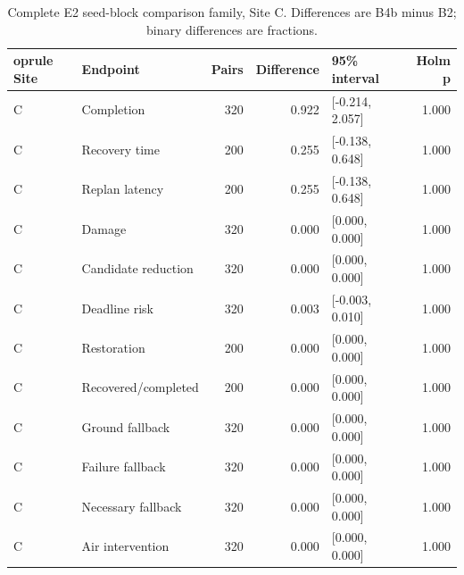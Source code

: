 \begin{table}[H]\centering\footnotesize
\caption{Complete E2 seed-block comparison family, Site C. Differences are B4b minus B2; binary differences are fractions.}\label{tab:e2_C}
\begin{tabularx}{\textwidth}{@{}lYrrYr@{}}	oprule
Site & Endpoint & Pairs & Difference & 95\% interval & Holm p \\\midrule
C & Completion & 320 & 0.922 & [-0.214, 2.057] & 1.000 \\
C & Recovery time & 200 & 0.255 & [-0.138, 0.648] & 1.000 \\
C & Replan latency & 200 & 0.255 & [-0.138, 0.648] & 1.000 \\
C & Damage & 320 & 0.000 & [0.000, 0.000] & 1.000 \\
C & Candidate reduction & 320 & 0.000 & [0.000, 0.000] & 1.000 \\
C & Deadline risk & 320 & 0.003 & [-0.003, 0.010] & 1.000 \\
C & Restoration & 200 & 0.000 & [0.000, 0.000] & 1.000 \\
C & Recovered/completed & 200 & 0.000 & [0.000, 0.000] & 1.000 \\
C & Ground fallback & 320 & 0.000 & [0.000, 0.000] & 1.000 \\
C & Failure fallback & 320 & 0.000 & [0.000, 0.000] & 1.000 \\
C & Necessary fallback & 320 & 0.000 & [0.000, 0.000] & 1.000 \\
C & Air intervention & 320 & 0.000 & [0.000, 0.000] & 1.000 \\
\bottomrule\end{tabularx}\end{table}
